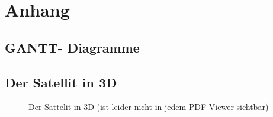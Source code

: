 \section{Anhang}

\subsection{GANTT- Diagramme}

\subsection{Der Satellit in 3D}
\begin{figure}[h] 
      \centering 
      \caption{Der Sattelit in 3D (ist leider nicht in jedem PDF Viewer sichtbar)}\label{fig:hla} 
\end{figure} 